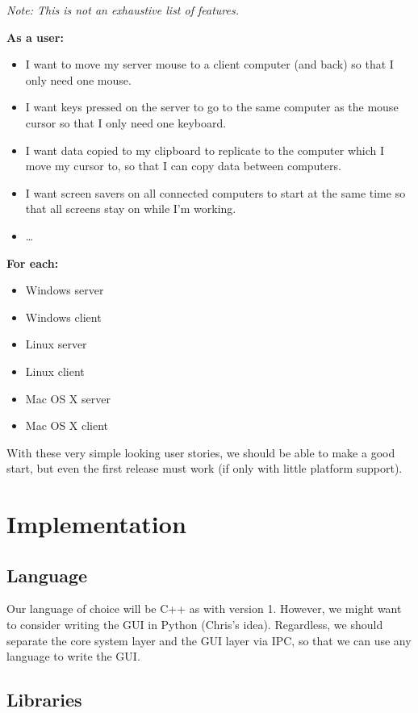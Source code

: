 \documentclass{article}
\begin{document}
\textit{Note: This is not an exhaustive list of features.}

\textbf{As a user:}

\begin{itemize}
  \item I want to move my server mouse to a client computer (and back) so that 
    I only need one mouse.
  \item I want keys pressed on the server to go to the same computer as the
    mouse cursor so that I only need one keyboard.
  \item I want data copied to my clipboard to replicate to the computer which
    I move my cursor to, so that I can copy data between computers.
  \item I want screen savers on all connected computers to start at the same
    time so that all screens stay on while I'm working.
  \item \ldots
\end{itemize}

\textbf{For each:}

\begin{itemize}
  \item Windows server
  \item Windows client
  \item Linux server
  \item Linux client
  \item Mac OS X server
  \item Mac OS X client
\end{itemize}

With these very simple looking user stories, we should be able to make a good 
start, but even the first release must work (if only with little platform
support).

\section{Implementation}

\subsection{Language}

Our language of choice will be C++ as with version 1. However, we might want to
consider writing the GUI in Python (Chris's idea). Regardless, we should 
separate the core system layer and the GUI layer via IPC, so that we can use
any language to write the GUI.

\subsection{Libraries}
\end{document}
